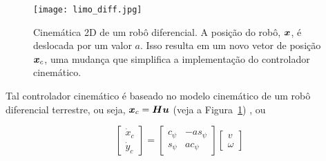         
    

    
    \begin{figure}[!b]
        \centering
        \texttt{[image: limo\_diff.jpg]}
        \caption{Cinemática 2D de um robô diferencial. A posição do robô, \( \boldsymbol{x} \), é deslocada por um valor \( a \). Isso resulta em um novo vetor de posição \( \boldsymbol{x}_c \), uma mudança que simplifica a implementação do controlador cinemático.} 
        \label{fig:differential_mode}
    \end{figure}
    
    Tal controlador cinemático é baseado no modelo cinemático de um robô diferencial terrestre, ou seja, \( \boldsymbol{x}_c = \boldsymbol{H} \boldsymbol{u} \) (veja a Figura~\ref{fig:differential_mode}) \cite{Sarcinelli-Filho2023_2}, ou
    
    \begin{equation}
        \begin{bmatrix} \dot{x}_c \\ \dot{y}_c  \end{bmatrix} = \begin{bmatrix} c_\psi & -a s_\psi \\ s_\psi & a c_\psi   \end{bmatrix} \begin{bmatrix} v \\ \omega    \end{bmatrix}
        \label{eq:kinematics_differential}
    \end{equation}
    
